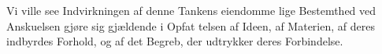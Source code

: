 %
Vi ville see Indvirkningen af denne Tankens eiendomme\-%
lige Bestemthed ved Anskuelsen gjøre sig gjældende i Opfat\-%
\setcounter{footnote}{0}
telsen af Ideen, af Materien, af deres indbyrdes Forhold, og
af det Begreb, der udtrykker deres Forbindelse.

